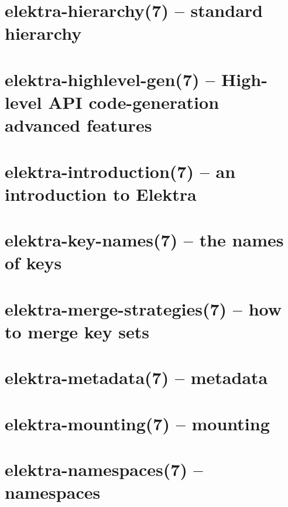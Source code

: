 \let\mypdfximage\pdfximage\def\pdfximage{\immediate\mypdfximage}\documentclass[twoside]{book}
\newcommand{\+}{\discretionary{\mbox{\scriptsize$\hookleftarrow$}}{}{}}
\begin{document}
\chapter{elektra-\/hierarchy(7) -- standard hierarchy}
\label{doc_help_elektra-hierarchy_md}

\chapter{elektra-\/highlevel-\/gen(7) -- High-\/level A\+PI code-\/generation advanced features}
\label{doc_help_elektra-highlevel-gen_md}

\chapter{elektra-\/introduction(7) -- an introduction to Elektra}
\label{doc_help_elektra-introduction_md}

\chapter{elektra-\/key-\/names(7) -- the names of keys}
\label{doc_help_elektra-key-names_md}

\chapter{elektra-\/merge-\/strategies(7) -- how to merge key sets}
\label{doc_help_elektra-merge-strategy_md}

\chapter{elektra-\/metadata(7) -- metadata}
\label{doc_help_elektra-metadata_md}

\chapter{elektra-\/mounting(7) -- mounting}
\label{doc_help_elektra-mounting_md}

\chapter{elektra-\/namespaces(7) -- namespaces}
\label{doc_help_elektra-namespaces_md}

\end{document}
